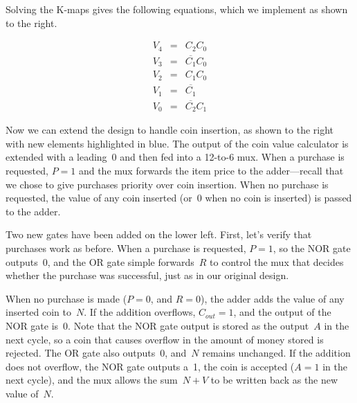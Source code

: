 \begin{minipage}{3.75in}
Solving the \mbox{K-maps} gives the following equations, which we
implement as shown to the right.\mpline

\begin{eqnarray*}
V_4 &=& C_2C_0\\
V_3 &=& \overline{C_1}C_0\\
V_2 &=& C_1C_0\\
V_1 &=& \overline{C_1}\\
V_0 &=& \overline{C_2}C_1
\end{eqnarray*}
\end{minipage}\hspace{0.25in}%
\begin{minipage}{2.5in}
\end{minipage}

\begin{minipage}{3.15in}
Now we can extend the design to handle coin insertion, as shown to the right
with new elements highlighted in blue.  The output of the coin value 
calculator is extended with a leading~0 and then fed into a \mbox{12-to-6} mux.
When a purchase is requested, $P=1$ and the mux forwards the item price to 
the adder---recall that we chose to give purchases priority over coin
insertion.  When no purchase is requested, the value of any coin inserted
(or~0 when no coin is inserted) is passed to the adder.\mpline

Two new gates have been added on the lower left.  First, let's verify that
purchases work as before.  When a purchase is requested, $P=1$, so the
NOR gate outputs~0, and the OR gate simple forwards~$R$ to control the
mux that decides whether the purchase was successful, just as in our
original design.\mpline

When no purchase is made ($P=0$, and $R=0$), the adder adds the value of 
any inserted coin to~$N$.  If the addition overflows, $C_{out}=1$, and
the output of the NOR gate is~0.  Note that the NOR gate output is stored
as the output~$A$ in the next cycle, so a coin that causes overflow in the
amount of money stored is rejected.  The OR gate also outputs~0, and~$N$
remains unchanged.  If the addition does not overflow, the NOR gate
outputs a~1, the coin is accepted ($A=1$ in the next cycle), and 
the mux allows the sum~$N+V$ to be written back as the new value of~$N$.
\end{minipage}\hspace{0.25in}%
\begin{minipage}{3.1in}
\end{minipage}


